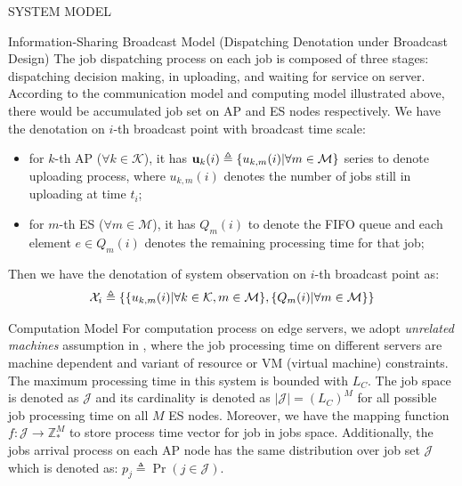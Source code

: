 \documentclass[10pt, conference, letterpaper]{IEEEtran}
\newcommand{\domZ}{\mathbb{Z}_{*}}
\newcommand{\define}{\triangleq}
\renewcommand{\vec}{\mathbf}
\DeclarePairedDelimiter{\set}{\{}{\}}
\newcommand{\apSet}{\mathcal{K}}
\newcommand{\esSet}{\mathcal{M}}
\newcommand{\jSpace}{\mathcal{J}}
\newcommand{\Obsv}{\mathcal{X}}
\begin{document}
\begin{section}{SYSTEM MODEL}
\begin{subsection}{Information-Sharing Broadcast Model}
            (Dispatching Denotation under Broadcast Design)
            The job dispatching process on each job is composed of three stages: dispatching decision making, in uploading, and waiting for service on server. According to the communication model and computing model illustrated above, there would be accumulated job set on AP and ES nodes respectively.
            We have the denotation on $i$-th broadcast point with broadcast time scale:
            \begin{itemize}
                \item for $k$-th AP ($\forall k\in\apSet$), it has $\vec{u}_k(i) \define \set{u_{k,m}(i)|\forall m\in\esSet}$ series to denote uploading process, where $u_{k,m}(i)$ denotes the number of jobs still in uploading at time $t_i$;
                \item for $m$-th ES ($\forall m\in\esSet$), it has $Q_m(i)$ to denote the FIFO queue and each element $e \in Q_m(i)$ denotes the remaining processing time for that job;
            \end{itemize}
            Then we have the denotation of system observation on $i$-th broadcast point as:
            \begin{align}
                \Obsv_i \define \{ \set{u_{k,m}(i)|\forall k\in\apSet,m\in\esSet}, \set{Q_m(i)|\forall m\in\esSet} \}
            \end{align}
        \end{subsection}

        \begin{subsection}{Computation Model}
            For computation process on edge servers, we adopt \emph{unrelated machines} assumption in \cite{tan-online}, where the job processing time on different servers are machine dependent and variant of resource or VM (virtual machine) constraints.
            The maximum processing time in this system is bounded with $L_C$.
            The job space is denoted as $\jSpace$ and its cardinality is denoted as $|\jSpace|=(L_C)^M$ for all possible job processing time on all $M$ ES nodes.
            Moreover, we have the mapping function $f:\jSpace \to \domZ^M$ to store process time vector for job in jobs space.
            Additionally, the jobs arrival process on each AP node has the same distribution over job set $\jSpace$ which is denoted as: $p_j \define \Pr(j\in\jSpace)$.
            

\end{subsection}
\end{section}
\end{document}
